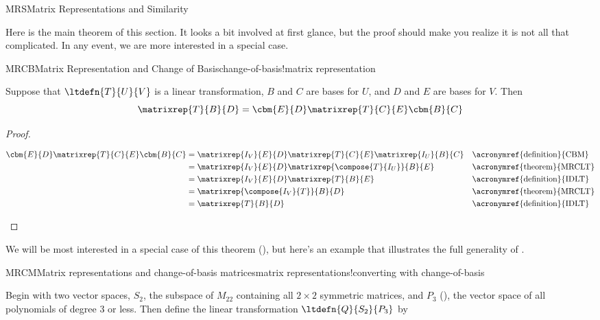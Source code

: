 \begin{subsect}{MRS}{Matrix Representations and Similarity}
%
\begin{para}Here is the main theorem of this section.  It looks a bit involved at first glance, but the proof should make you realize it is not all that complicated.  In any event, we are more interested in a special case.\end{para}
%
\begin{theorem}{MRCB}{Matrix Representation and Change of Basis}{change-of-basis!matrix representation}
\begin{para}Suppose that $\ltdefn{T}{U}{V}$ is a linear transformation, $B$ and $C$ are bases for $U$, and $D$ and $E$ are bases for $V$.  Then
%
\begin{equation*}
\matrixrep{T}{B}{D}=\cbm{E}{D}\matrixrep{T}{C}{E}\cbm{B}{C}
\end{equation*}
\end{para}
%
\end{theorem}
%
\begin{proof}
%
\begin{para}
\begin{align*}
\cbm{E}{D}\matrixrep{T}{C}{E}\cbm{B}{C}
&=\matrixrep{I_V}{E}{D}\matrixrep{T}{C}{E}\matrixrep{I_U}{B}{C}&&\text{\acronymref{definition}{CBM}}\\
&=\matrixrep{I_V}{E}{D}\matrixrep{\compose{T}{I_U}}{B}{E}&&\text{\acronymref{theorem}{MRCLT}}\\
&=\matrixrep{I_V}{E}{D}\matrixrep{T}{B}{E}&&\text{\acronymref{definition}{IDLT}}\\
&=\matrixrep{\compose{I_V}{T}}{B}{D}&&\text{\acronymref{theorem}{MRCLT}}\\
&=\matrixrep{T}{B}{D}&&\text{\acronymref{definition}{IDLT}}
\end{align*}
\end{para}
%
\end{proof}
%
\begin{para}We will be most interested in a special case of this theorem (), but here's an example that illustrates the full generality of .\end{para}
%
\begin{example}{MRCM}{Matrix representations and change-of-basis matrices}{matrix representations!converting with change-of-basis}
%
\begin{para}Begin with two vector spaces, $S_2$, the subspace of $M_{22}$ containing all $2\times 2$ symmetric matrices, and $P_3$ (), the vector space of all polynomials of degree 3 or less.  Then define the linear transformation $\ltdefn{Q}{S_2}{P_3}$ by

\end{para}
\end{example}
\end{subsect}
